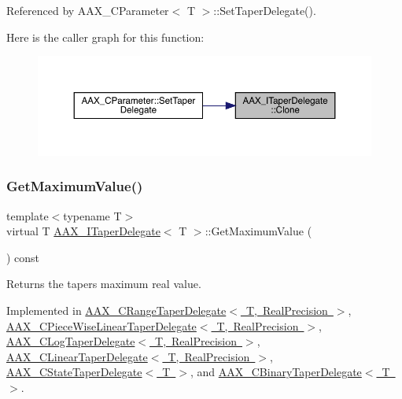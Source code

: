 Referenced by A\+A\+X\+\_\+\+C\+Parameter$<$ T $>$\+::\+Set\+Taper\+Delegate().

Here is the caller graph for this function\+:
\nopagebreak
\begin{figure}[H]
\begin{center}
\leavevmode
\includegraphics[width=350pt]{a01881_a80ce054ca716147155fe0682adf4e469_icgraph}
\end{center}
\end{figure}
\mbox{\label{a01881_a9b14f7d73d614b6c012ed03fadb9f0eb}} 
\subsubsection{\texorpdfstring{GetMaximumValue()}{GetMaximumValue()}}
{\footnotesize\ttfamily template$<$typename T$>$ \\
virtual T \mbox{\hyperlink{a01881}{A\+A\+X\+\_\+\+I\+Taper\+Delegate}}$<$ T $>$\+::Get\+Maximum\+Value (\begin{DoxyParamCaption}{ }\end{DoxyParamCaption}) const\hspace{0.3cm}{\ttfamily [pure virtual]}}



Returns the taper\textquotesingle{}s maximum real value. 



Implemented in \mbox{\hyperlink{a01557_a37653711483325931180ed54234b63ec}{A\+A\+X\+\_\+\+C\+Range\+Taper\+Delegate$<$ T, Real\+Precision $>$}}, \mbox{\hyperlink{a01553_a260b67b9ff2b06265c705c126d045507}{A\+A\+X\+\_\+\+C\+Piece\+Wise\+Linear\+Taper\+Delegate$<$ T, Real\+Precision $>$}}, \mbox{\hyperlink{a01497_a758cba19d16615578682d0c6af7d0496}{A\+A\+X\+\_\+\+C\+Log\+Taper\+Delegate$<$ T, Real\+Precision $>$}}, \mbox{\hyperlink{a01493_a52dccdec4565f1057a4a5b304fc51161}{A\+A\+X\+\_\+\+C\+Linear\+Taper\+Delegate$<$ T, Real\+Precision $>$}}, \mbox{\hyperlink{a01569_aeb4ff10c4750236caa03be5f04c9eaba}{A\+A\+X\+\_\+\+C\+State\+Taper\+Delegate$<$ T $>$}}, and \mbox{\hyperlink{a01457_a1abc18860a0c404676c52d8d1d8b7724}{A\+A\+X\+\_\+\+C\+Binary\+Taper\+Delegate$<$ T $>$}}.

